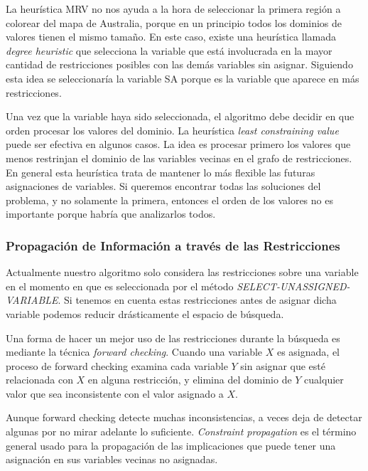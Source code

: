 La heur\'istica MRV no nos ayuda a la hora de seleccionar la primera regi\'on a colorear del mapa de Australia, porque en un principio todos los dominios de valores tienen el mismo tamaño. En este caso, existe una heur\'istica llamada \emph{degree heuristic} que selecciona la variable que est\'a involucrada en la mayor cantidad de restricciones posibles con las dem\'as variables sin asignar. Siguiendo esta idea se seleccionar\'ia la variable SA porque es la variable que aparece en m\'as restricciones.

Una vez que la variable haya sido seleccionada, el algoritmo debe decidir en que orden procesar los valores del dominio. La heur\'istica \emph{least constraining value} puede ser efectiva en algunos casos. La idea es procesar primero los valores que menos restrinjan el dominio de las variables vecinas en el grafo de restricciones. En general esta heur\'istica trata de mantener lo m\'as flexible las futuras asignaciones de variables. Si queremos encontrar todas las soluciones del problema, y no solamente la primera, entonces el orden de los valores no es importante porque habr\'ia que analizarlos todos.

\subsubsection{Propagaci\'on de Informaci\'on a trav\'es de las Restricciones}

Actualmente nuestro algoritmo solo considera las restricciones sobre una variable en el momento en que es seleccionada por el m\'etodo \emph{SELECT-UNASSIGNED-VARIABLE}. Si tenemos en cuenta estas restricciones antes de asignar dicha variable podemos reducir dr\'asticamente el espacio de b\'usqueda.

Una forma de hacer un mejor uso de las restricciones durante la b\'usqueda es mediante la t\'ecnica \emph{forward checking}. Cuando una variable $X$ es asignada, el proceso de forward checking examina cada variable $Y$ sin asignar que est\'e relacionada con $X$ en alguna restricci\'on, y elimina del dominio de $Y$ cualquier valor que sea inconsistente con el valor asignado a $X$.

Aunque forward checking detecte muchas inconsistencias, a veces deja de detectar algunas por no mirar adelante lo suficiente. \emph{Constraint propagation} es el t\'ermino general usado para la propagaci\'on de las implicaciones que puede tener una asignaci\'on en sus variables vecinas no asignadas.

